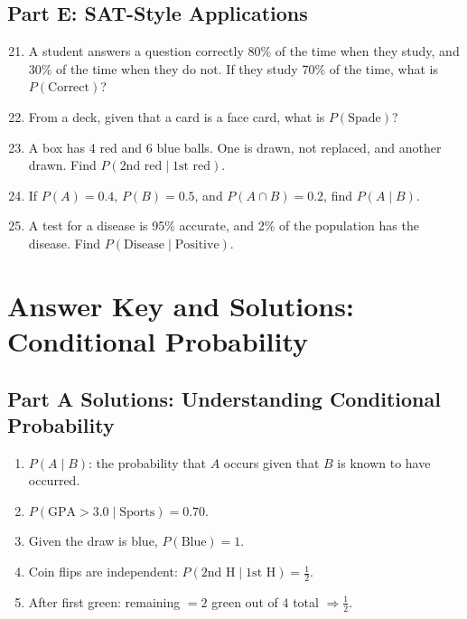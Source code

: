 \documentclass[14pt]{extarticle}
\begin{document}
\subsection*{Part E: SAT-Style Applications}
\begin{enumerate}
  \setcounter{enumi}{20}
  \item A student answers a question correctly 80\% of the time when they study, and 30\% of the time when they do not. If they study 70\% of the time, what is \(P(\text{Correct})\)?
  \item From a deck, given that a card is a face card, what is \(P(\text{Spade})\)?
  \item A box has 4 red and 6 blue balls. One is drawn, not replaced, and another drawn. Find \(P(\text{2nd red}\mid \text{1st red})\).
  \item If \(P(A)=0.4\), \(P(B)=0.5\), and \(P(A\cap B)=0.2\), find \(P(A\mid B)\).
  \item A test for a disease is 95\% accurate, and 2\% of the population has the disease. Find \(P(\text{Disease}\mid \text{Positive})\).
\end{enumerate}

\newpage


\section*{Answer Key and Solutions: Conditional Probability}

\subsection*{Part A Solutions: Understanding Conditional Probability}
\begin{enumerate}
  \item \(P(A\mid B)\): the probability that \(A\) occurs given that \(B\) is known to have occurred.
  \item \(P(\text{GPA}>3.0\mid \text{Sports})=\boxed{0.70}\).
  \item Given the draw is blue, \(P(\text{Blue})=\boxed{1}\).
  \item Coin flips are independent: \(P(\text{2nd H}\mid \text{1st H})=\boxed{\tfrac{1}{2}}\).
  \item After first green: remaining \(=2\) green out of \(4\) total \(\Rightarrow \boxed{\tfrac{1}{2}}\).
\end{enumerate}
\end{document}
